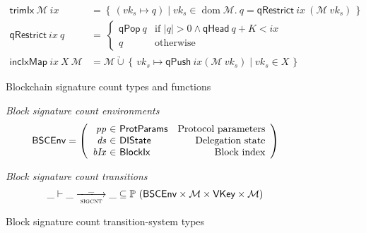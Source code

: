 \documentclass[11pt,a4paper]{article}
\DeclareMathOperator{\dom}{dom}
\newcommand{\powerset}[1]{\mathbb{P}~#1}
\newcommand\Set[2]{\left\{\,#1\mid#2\,\right\}}
\newcommand{\unionoverride}{\mathbin{\underrightarrow\cup}}
\newcommand{\var}[1]{\mathit{#1}}
\newcommand{\fun}[1]{\mathsf{#1}}
\newcommand{\type}[1]{\mathsf{#1}}
\newcommand{\size}[1]{\left| #1 \right|}
\newcommand{\trans}[2]{\xlongrightarrow[\textsc{#1}]{#2}}
\newcommand{\BlockIx}{\type{BlockIx}}
\newcommand{\VKey}{\type{VKey}}
\newcommand{\DelegState}{\type{DIState}}
\newcommand{\ProtParams}{\type{ProtParams}} %
\newcommand{\signmapname}{\mathcal{M}}
\newcommand{\trimixname}{trimIx}
\newcommand{\incixmapname}{incIxMap}
\newcommand{\qrestrname}{qRestrict}
\newcommand{\qpopname}{qPop}
\newcommand{\qheadname}{qHead}
\newcommand{\qpushname}{qPush}
\newcommand{\signmap}[1]{\fun{\signmapname} ~ #1}
\newcommand{\qrestr}[2]{\fun{\qrestrname} ~ #1 ~ #2}
\newcommand{\trimix}[2]{\fun{\trimixname} ~ #1 ~ #2}
\newcommand{\incixmap}[3]{\fun{\incixmapname} ~ #1 ~ #2 ~ #3}
\newcommand{\qpop}[1]{\fun{\qpopname} ~ #1}
\newcommand{\qhead}[1]{\fun{\qheadname} ~ #1}
\newcommand{\qpush}[1]{\fun{\qpushname} ~ #1}
\newcommand{\partialf}{\mapsto}
\begin{document}
\begin{figure}[ht]
\begin{align}
  \label{eq:trimix}
  \trimix{\signmapname}{\var{ix}} & = \Set{(\var{vk_s} \partialf q)}{\var{vk_s} \in \dom \signmapname.~
  q = \qrestr{\var{ix}}{(\signmap{\var{vk_s}}})} \\
  \qrestr{\var{ix}}{q} & = \
  \begin{cases}
    \qpop{q} & \text{if } \size{q} > 0 \wedge \qhead{q} + K < \var{ix} \\
    q & \text{otherwise}
  \end{cases} \\
  \label{eq:incixmap}
    \incixmap{\var{ix}}{\var{X}}{\signmapname} & = \signmapname \unionoverride
                                                 \Set{\var{vk_s} \partialf \qpush{\var{ix}}(\signmap{\var{vk_s}})}{vk_s \in \var{X}}
  \end{align}
  \caption{Blockchain signature count types and functions}
  \label{fig:defs:sigcnt}
\end{figure}

\begin{figure}[ht]
  \emph{Block signature count environments}
  \begin{equation*}
    \BSCEnv =
    \left(
      \begin{array}{r@{~\in~}lr}
        \var{pp} & \ProtParams & \text{Protocol parameters} \\
        \var{ds} & \DelegState & \text{Delegation state} \\
        \var{bIx} & \BlockIx & \text{Block index}
      \end{array}
    \right)
  \end{equation*}

  \emph{Block signature count transitions}
  \begin{equation*}
    \_ \vdash \var{\_} \trans{sigcnt}{\_} \var{\_} \subseteq
    \powerset (\BSCEnv \times \signmapname \times \VKey \times \signmapname)
  \end{equation*}
  \caption{Block signature count transition-system types}
  \label{fig:ts-types:sigcnt}
\end{figure}
\end{document}
